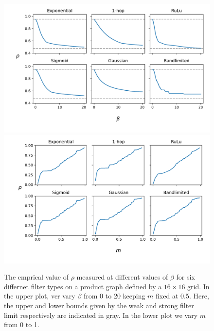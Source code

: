 \begin{figure}[t]
    \includegraphics[width=0.88\linewidth]{Figures/beta-rho-plot.pdf}
    \includegraphics[width=0.88\linewidth]{Figures/m-rho-plot.pdf}    
    \caption{\small{ The emprical  value of $\rho$ measured at different values of $\beta$ for six differnet filter types on a product graph defined by a $16 \times 16$ grid. In the upper plot, ver vary $\beta$ from 0 to 20 keeping $m$ fixed at 0.5. Here, the upper and lower bounds given by the weak and strong filter limit respectively are indicated in gray. In the lower plot we vary $m$ from 0 to 1. }}
    \label{fig:beta_rho_plot}
\end{figure}

\newpage





